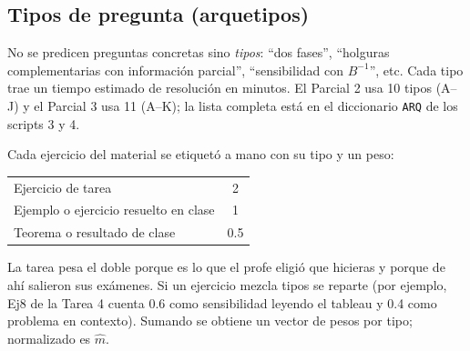 \documentclass[11pt]{article}
\newcommand{\cod}[1]{\texttt{#1}}
\begin{document}
\subsection{Tipos de pregunta (arquetipos)}
No se predicen preguntas concretas sino \emph{tipos}: ``dos fases'', ``holguras
complementarias con información parcial'', ``sensibilidad con $B^{-1}$'', etc. Cada tipo trae
un tiempo estimado de resolución en minutos. El Parcial 2 usa 10 tipos (A--J) y el Parcial 3
usa 11 (A--K); la lista completa está en el diccionario \cod{ARQ} de los scripts 3 y 4.

Cada ejercicio del material se etiquetó a mano con su tipo y un peso:

\begin{center}
\begin{tabular}{lc}
\toprule
Ejercicio de tarea & 2 \\
Ejemplo o ejercicio resuelto en clase & 1 \\
Teorema o resultado de clase & 0.5 \\
\bottomrule
\end{tabular}
\end{center}

La tarea pesa el doble porque es lo que el profe eligió que hicieras y porque de ahí salieron
sus exámenes. Si un ejercicio mezcla tipos se reparte (por ejemplo, Ej8 de la Tarea 4 cuenta
0.6 como sensibilidad leyendo el tableau y 0.4 como problema en contexto). Sumando se obtiene
un vector de pesos por tipo; normalizado es $\hat m$.
\end{document}
